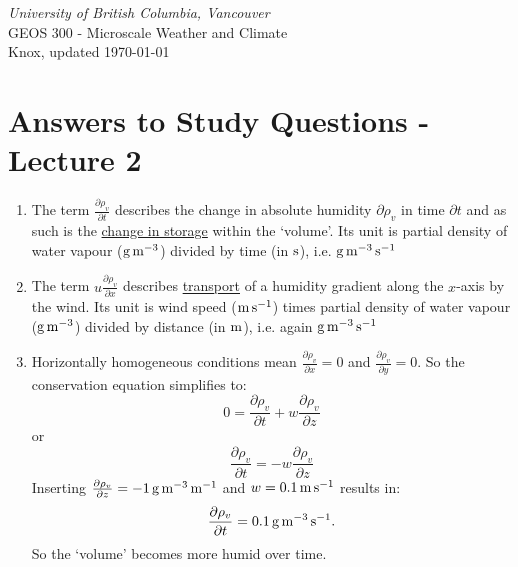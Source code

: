 \documentclass[11pt]{article}
\author{Andreas Christen}
\begin{document}
\begin{center}
\emph{University of British Columbia, Vancouver}\\
GEOS 300 - Microscale Weather and Climate\\
Knox, updated \today
\section*{Answers to Study Questions - Lecture 2}

\vspace{0.5cm}
\end{center}

\begin{enumerate}

\item The term $\frac{\partial \rho_v}{\partial t} $ describes the change in absolute humidity $\partial \rho_v$ in time $\partial t$ and as such is the \underline{change in storage} within the `volume'. Its unit is partial density of water vapour ($\rm{g}\,\rm{m}^{-3}$) divided by time (in $\rm{s}$), i.e. \underline{$\rm{g}\,\rm{m}^{-3}\,\rm{s}^{-1}$}

\item The term $u \frac{\partial \rho_v}{\partial x}$ describes \underline{transport} of a humidity gradient along the $x$-axis by the wind. Its unit is wind speed ($\rm{m}\,\rm{s}^{-1}$) times partial density of water vapour ($\rm{g}\,\rm{m}^{-3}$) divided by distance (in $\rm{m}$), i.e. again \underline{$\rm{g}\,\rm{m}^{-3}\,\rm{s}^{-1}$}

\item Horizontally homogeneous conditions mean $\frac{\partial \rho_v}{\partial x} = 0$ and $\frac{\partial \rho_v}{\partial y} = 0$. So the conservation equation simplifies to:
\begin{equation}
0 = \frac{\partial \rho_v}{\partial t} + w \frac{\partial \rho_v}{\partial z} 
\end{equation}
or 
\begin{equation}
\frac{\partial \rho_v}{\partial t} = - w \frac{\partial \rho_v}{\partial z} 
\end{equation}
Inserting $\frac{\partial \rho_v}{\partial z} = -1\,\rm{g}\,\rm{m}^{-3}\,\rm{m}^{-1}$ and $w = 0.1 \,\rm{m}\,\rm{s}^{-1}$ results in:
\begin{equation}
\frac{\partial \rho_v}{\partial t} = 0.1\,\rm{g}\,\rm{m}^{-3}\,\rm{s}^{-1}.
\end{equation}
So the `volume' becomes more humid over time.

\end{enumerate}
\end{document}
